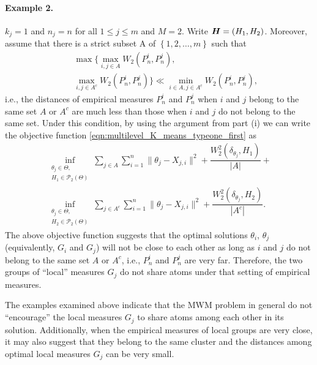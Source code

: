 \paragraph{Example 2.} $k_{j}=1$ and $n_{j}=n$ for all $1 \leq  j \leq m$ and $M=2$. 
Write $\boldsymbol{H} = (H_1,H_2)$.
Moreover, assume that there is a strict subset A of $\left\{1,2,\ldots,m\right\}$ 
such that 
\vspace{-6pt}
\begin{eqnarray}
& & \mathop {\max }\biggr\{\mathop {\max }\limits_{i, j \in A}{W_{2}(P_{n}^{i},P_{n}^{j})}, \nonumber \\
& & \mathop {\max }\limits_{i, j \in A^{c}}{W_{2}(P_{n}^{i},P_{n}^{j})}\biggr\} \ll \mathop {\min }\limits_{i \in A, j \in A^{c}}{W_{2}(P_{n}^{i},P_{n}^{j})}, \nonumber 
\end{eqnarray}
i.e., the distances of empirical measures $P_{n}^{i}$ and $P_{n}^{j}$ when $i$ and $j$ 
belong to the same set $A$ or $A^{c}$ are much less than those when $i$ and $j$ do not 
belong to the same set. Under this condition, by using the argument from part (i) we can write 
the objective function \eqref{eqn:multilevel_K_means_typeone_first} as 
\vspace{-6pt}
\begin{eqnarray}
\mathop {\inf }\limits_{\substack {\theta_{j} \in \Theta, \\ H_{1} \in \mathcal{P}_{2}(\Theta)}}{\sum \limits_{j \in A}{\sum \limits_{i=1}^{n}{\|\theta_{j}-X_{j,i}\|^{2}}}+\dfrac{W_{2}^{2}(\delta_{\theta_{j}},H_{1})}{|A|}}+ \nonumber \\ 
\mathop {\inf }\limits_{\substack {\theta_{j} \in \Theta, \\ H_{2} \in \mathcal{P}_{2}(\Theta)}}{\sum \limits_{j \in A^{c}}{\sum \limits_{i=1}^{n}{\|\theta_{j}-X_{j,i}\|^{2}}}+\dfrac{W_{2}^{2}(\delta_{\theta_{j}},H_{2})}{|A^{c}|}}. \nonumber
\end{eqnarray}
The above objective function suggests that the optimal solutions $\theta_{i}$, $\theta_{j}$ 
(equivalently, $G_{i}$ and $G_{j}$) will not be close to each other as long as $i$ and 
$j$ do not belong to the same set $A$ or $A^{c}$, i.e., $P_{n}^{i}$ and $P_{n}^{j}$ are 
very far. Therefore, the two groups of ``local'' measures $G_{j}$ do not share atoms under that 
setting of empirical measures.

The examples examined above indicate that the MWM problem in general
do not ``encourage'' the local measures $G_{j}$ to share atoms among each other in its solution. Additionally, 
when the empirical measures of local groups are very close, it may also suggest that they 
belong to the same cluster and the distances among optimal local measures $G_{j}$ can be 
very small. 

